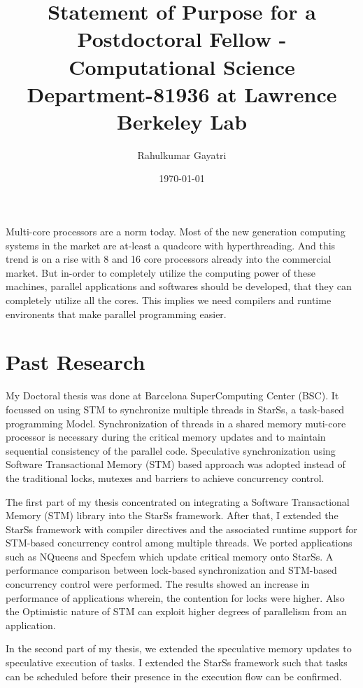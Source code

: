 \documentclass{article}
\title{Statement of Purpose for a Postdoctoral Fellow - Computational Science Department-81936 at Lawrence Berkeley Lab}
\author{Rahulkumar Gayatri}
\date{\today}
\begin{document}
\maketitle%
\mbox{}\newline
Multi-core processors are a norm today. Most of the new generation computing systems in the market are at-least a quadcore with hyperthreading. 
And this trend is on a rise with 8 and 16 core processors already into the commercial market.
But in-order to completely utilize the computing power of these machines, parallel applications and softwares should be developed, that they can completely utilize all the cores.
This implies we need compilers and runtime environents that make parallel programming easier. 

%
\section{Past Research}
%
\par
My Doctoral thesis was done at Barcelona SuperComputing Center (BSC).
It focussed on using STM to synchronize multiple threads in StarSs, a task-based programming Model.
Synchronization of threads in a shared memory muti-core processor is necessary during the critical memory updates and to maintain sequential consistency of the parallel code.
Speculative synchronization using Software Transactional Memory (STM) based approach was adopted instead of the traditional locks, mutexes and barriers to achieve concurrency control. 
%
\par
The first part of my thesis concentrated on integrating a Software Transactional Memory (STM) library into the StarSs framework.
After that, I extended the StarSs framework with compiler directives and the associated runtime support for STM-based concurrency control among multiple threads.
We ported applications such as NQueens and Specfem which update critical memory onto StarSs.
A performance comparison between lock-based synchronization and STM-based concurrency control were performed.
The results showed an increase in performance of applications wherein, the contention for locks were higher.
Also the Optimistic nature of STM can exploit higher degrees of parallelism from an application. 
%
\par
In the second part of my thesis, we extended the speculative memory updates to speculative execution of tasks.
I extended the StarSs framework such that tasks can be scheduled before their presence in the execution flow can be confirmed.
\end{document}
